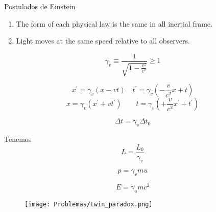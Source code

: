 





\begin{cajita}
    Postulados de Einstein
    \begin{enumerate}
        \item  The form of each physical law is the same in all inertial frame. 
        \item Light moves at the same speed relative to all observers.
    \end{enumerate}  
\end{cajita}

$$
\gamma_{v} \equiv \frac{1}{\sqrt{1-\frac{v^{2}}{c^{2}}}} \geq 1
$$

$$
x^{\prime}=\gamma_{v}(x-v t)  \quad t^{\prime}=\gamma_{v}\left(-\frac{v}{c^{2}} x+t\right)
$$
$$
x=\gamma_{v}\left(x^{\prime}+v t^{\prime}\right) \quad \quad t=\gamma_{v}\left(+\frac{v}{c^{2}} x^{\prime}+t^{\prime}\right)
$$

$$\Delta t =\gamma_v \Delta t_0$$

\begin{definicion}
    Tenemos 
    $$L=\frac{L_0}{\gamma_v }$$
\end{definicion}

$$p=\gamma_v mu$$

$$E = \gamma_u mc^2$$

\begin{figure}[H]
   \centering 
   \texttt{[image: Problemas/twin\_paradox.png]} 
\end{figure}

%
%

